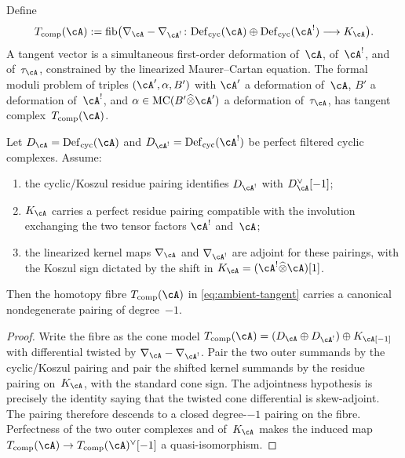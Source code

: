 \begin{definition}
\label{def:ambient-tangent-complex}
Define
\begin{equation}\label{eq:ambient-tangent}
T_{\mathrm{comp}}(\cA)
:= \mathrm{fib}\bigl(
 \nabla_\cA - \nabla_{\cA^!} \colon
 \mathrm{Def}_{\mathrm{cyc}}(\cA) \oplus
 \mathrm{Def}_{\mathrm{cyc}}(\cA^!)
 \longrightarrow K_\cA
\bigr).
\end{equation}
A tangent vector is a simultaneous first-order deformation
of~$\cA$, of~$\cA^!$, and of~$\tau_\cA$, constrained by the
linearized Maurer--Cartan equation. The formal moduli problem
of triples $(\cA', \alpha, B')$ with $\cA'$ a deformation
of~$\cA$, $B'$ a deformation of~$\cA^!$, and
$\alpha \in \mathrm{MC}(B' \widehat{\otimes} \cA')$ a
deformation of~$\tau_\cA$, has tangent
complex~$T_{\mathrm{comp}}(\cA)$.
\end{definition}

\begin{proposition}
\label{prop:ambient-self-duality}
Let
$D_\cA=\mathrm{Def}_{\mathrm{cyc}}(\cA)$ and
$D_{\cA^!}=\mathrm{Def}_{\mathrm{cyc}}(\cA^!)$ be perfect
filtered cyclic complexes. Assume:
\begin{enumerate}[label=\textup{(\roman*)}]
\item the cyclic/Koszul residue pairing identifies
 $D_{\cA^!}$ with $D_\cA^\vee[-1]$;
\item $K_\cA$ carries a perfect residue pairing compatible with
 the involution exchanging the two tensor factors
 $\cA^!$ and~$\cA$;
\item the linearized kernel maps
 $\nabla_\cA$ and $\nabla_{\cA^!}$ are adjoint for these
 pairings, with the Koszul sign dictated by the shift in
 $K_\cA=(\cA^!\widehat{\otimes}\cA)[1]$.
\end{enumerate}
Then the homotopy fibre
$T_{\mathrm{comp}}(\cA)$ in
\eqref{eq:ambient-tangent} carries a canonical
nondegenerate pairing of degree~$-1$.
\end{proposition}

\begin{proof}
Write the fibre as the cone model
$T_{\mathrm{comp}}(\cA)=
(D_\cA\oplus D_{\cA^!})\oplus K_\cA[-1]$ with differential
twisted by $\nabla_\cA-\nabla_{\cA^!}$. Pair the two outer
summands by the cyclic/Koszul pairing and pair the shifted
kernel summands by the residue pairing on~$K_\cA$, with the
standard cone sign. The adjointness hypothesis is precisely the
identity saying that the twisted cone differential is
skew-adjoint. The pairing therefore descends to a closed
degree-$-1$ pairing on the fibre. Perfectness of the two outer
complexes and of~$K_\cA$ makes the induced map
$T_{\mathrm{comp}}(\cA)\to T_{\mathrm{comp}}(\cA)^\vee[-1]$
a quasi-isomorphism.
\end{proof}

